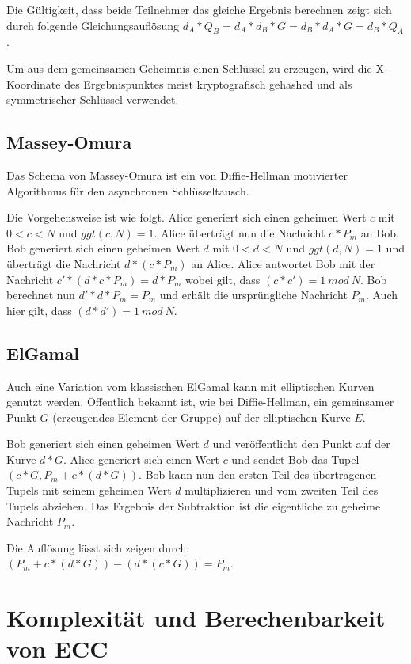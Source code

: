 Die Gültigkeit, dass beide Teilnehmer das gleiche Ergebnis berechnen zeigt sich durch folgende Gleichungsauflösung 
$d_A*Q_B = d_A*d_B*G = d_B*d_A*G = d_B*Q_A$.

Um aus dem gemeinsamen Geheimnis einen Schlüssel zu erzeugen, wird die X-Koordinate des Ergebnispunktes meist kryptografisch gehashed und
als symmetrischer Schlüssel verwendet.

\subsection{Massey-Omura}

Das Schema von Massey-Omura ist ein von Diffie-Hellman motivierter Algorithmus für den asynchronen Schlüsseltausch.

Die Vorgehensweise ist wie folgt. Alice generiert sich einen geheimen Wert $c$ mit $0 < c < N$ und $ggt(c,N) = 1$.
Alice überträgt nun die Nachricht $c * P_m$ an Bob.
Bob generiert sich einen geheimen Wert $d$ mit $0 < d < N$ und $ggt(d,N) = 1$ und überträgt die Nachricht
$d * (c * P_m)$ an Alice.
Alice antwortet Bob mit der Nachricht $c' * (d * c * P_m) = d * P_m$ wobei gilt, dass $(c * c') = 1\ mod\ N$.
Bob berechnet nun $d' * d * P_m = P_m$ und erhält die ursprüngliche Nachricht $P_m$. Auch hier gilt, dass $(d * d') = 1\ mod\ N$.

\subsection{ElGamal}

Auch eine Variation vom klassischen ElGamal kann mit elliptischen Kurven genutzt werden.
Öffentlich bekannt ist, wie bei Diffie-Hellman, ein gemeinsamer Punkt $G$ (erzeugendes Element der Gruppe) auf der elliptischen Kurve $E$.

Bob generiert sich einen geheimen Wert $d$ und veröffentlicht den Punkt auf der Kurve $d * G$.
Alice generiert sich einen Wert $c$ und sendet Bob das Tupel $(c * G, P_m + c*(d*G))$. 
Bob kann nun den ersten Teil des übertragenen Tupels mit seinem geheimen Wert $d$ multiplizieren und vom zweiten Teil des Tupels abziehen.
Das Ergebnis der Subtraktion ist die eigentliche zu geheime Nachricht $P_m$.

Die Auflösung lässt sich zeigen durch: $(P_m + c * (d * G)) - (d * (c * G)) = P_m$.

\section{Komplexität und Berechenbarkeit von ECC}

